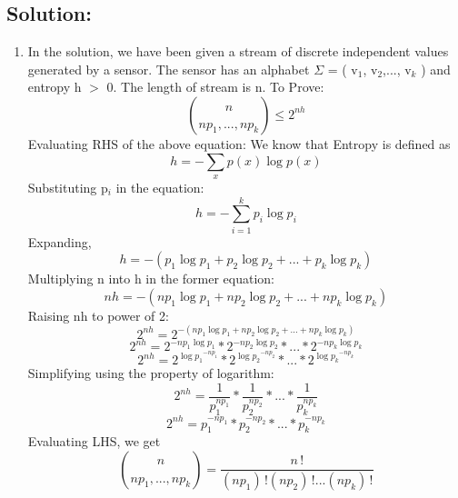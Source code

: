 \documentclass[12pt,a4paper]{article}
\begin{document}
\subsection{Solution: }
\begin{enumerate}[label=\alph*]
    \item In the solution, we have been given a stream of discrete independent values generated by a sensor. The sensor has an alphabet $\Sigma$ = ( v$_{1}$, v$_{2}$,..., v$_{k}$ ) and entropy h $>$ 0. The length of stream is n. To Prove:
    \begin{equation*}
        \binom{n}{np_{1},...,np_{k}} \leq 2^{nh}
    \end{equation*}
    Evaluating RHS of the above equation:
    We know that Entropy is defined as
    \begin{equation*}
        h = -\sum_{x}p(x)\log{p(x)}
    \end{equation*}
    Substituting p$_{i}$ in the equation:
    \begin{equation*}
        h = -\sum_{i=1}^{k}p_{i}\log{p_{i}}
    \end{equation*}
    Expanding, 
    \begin{equation*}
        h = -(p_{1}\log{p_{1}} + p_{2}\log{p_{2}}  + ... + p_{k}\log{p_{k}})
    \end{equation*}
    Multiplying n into h in the former equation:
    \begin{equation*}
        nh = -(np_{1}\log{p_{1}} + np_{2}\log{p_{2}}  + ... + np_{k}\log{p_{k}})
    \end{equation*}
    Raising nh to power of 2:
    \begin{equation*}
        2^{nh} = 2^{-(np_{1}\log{p_{1}} + np_{2}\log{p_{2}}  + ... + np_{k}\log{p_{k}})}
    \end{equation*}
    \begin{equation*}
        2^{nh} = 2^{-np_{1}\log{p_{1}}} * 2^{-np_{2}\log{p_{2}}}  * ... * 2^{-np_{k}\log{p_{k}}}
    \end{equation*}
    \begin{equation*}
        2^{nh} = 2^{\log{p_{1}}^{-np_{1}}} * 2^{\log{p_{2}}^{-np_{2}}}  * ... * 2^{\log{p_{k}}^{-np_{k}}}
    \end{equation*}
    Simplifying using the property of logarithm:
    \begin{equation*}
        2^{nh} = \frac{1}{p_{1}^{np_{1}}} * \frac{1}{p_{2}^{np_{2}}}  * ... * \frac{1}{p_{k}^{np_{k}}}
    \end{equation*}
    \begin{equation}
        2^{nh} = p_{1}^{-np_{1}} * p_{2}^{-np_{2}}  * ... * p_{k}^{-np_{k}}
    \end{equation}
    Evaluating LHS, we get 
    \begin{equation*}
    \binom{n}{np_{1},...,np_{k}} = \frac{n\,!}{(np_{1})\,!(np_{2})\,! ... (np_{k})\,!}
    \end{equation*}
    

\end{enumerate}
\end{document}
